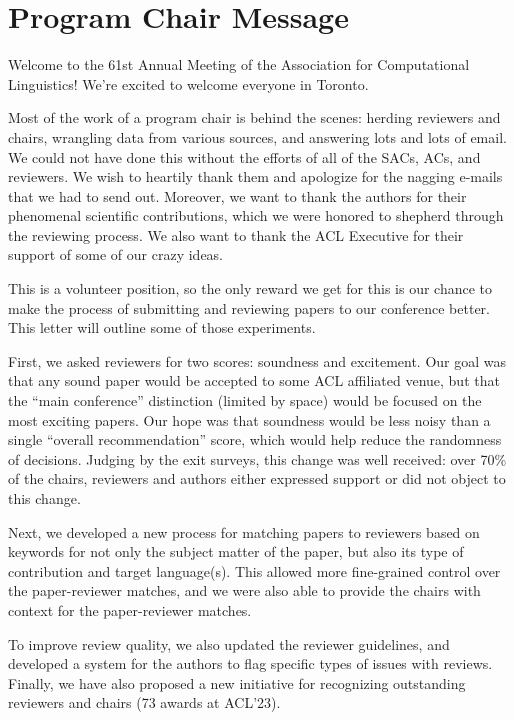 \section{Program Chair Message}

Welcome to the 61st Annual Meeting of the Association for Computational Linguistics! We’re excited to welcome everyone in Toronto.  

Most of the work of a program chair is behind the scenes: herding reviewers and chairs, wrangling data from various sources, and answering lots and lots of email. We could not have done this without the efforts of all of the SACs, ACs, and reviewers. We wish to heartily thank them and apologize for the nagging e-mails that we had to send out.  Moreover, we want to thank the authors for their phenomenal scientific contributions, which we were honored to shepherd through the reviewing process. We also want to thank the ACL Executive for their support of some of our crazy ideas.

This is a volunteer position, so the only reward we get for this is our chance to make the process of submitting and reviewing papers to our conference better. This letter will outline some of those experiments.  

First, we asked reviewers for two scores: soundness and excitement.  Our goal was that any sound paper would be accepted to some ACL affiliated venue, but that the “main conference” distinction (limited by space) would be focused on the most exciting papers.  Our hope was that soundness would be less noisy than a single “overall recommendation” score, which would help reduce the randomness of decisions. Judging by the exit surveys, this change was well received: over 70\% of the chairs, reviewers and authors either expressed support or did not object to this change.

Next, we developed a new process for matching papers to reviewers based on keywords for not only the subject matter of the paper, but also its type of contribution and target language(s). This allowed more fine-grained control over the paper-reviewer matches, and we were also able to provide the chairs with context for the paper-reviewer matches.  

To improve review quality, we also updated the reviewer guidelines, and developed a system for the authors to flag specific types of issues with reviews. Finally, we have also proposed a new initiative for recognizing outstanding reviewers and chairs (73 awards at ACL'23).

